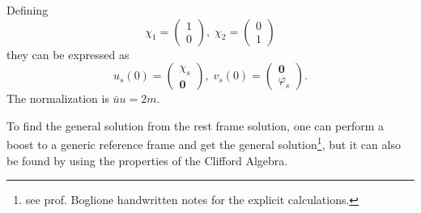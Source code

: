 Defining
$$\chi_1 = \begin{pmatrix}1\\0\end{pmatrix},\;
\chi_2 = \begin{pmatrix}0\\1\end{pmatrix}$$
they can be expressed as
$$u_s(0)=\begin{pmatrix}\chi_s\\\mathbf{0}\end{pmatrix},\;
v_s(0)=\begin{pmatrix}\mathbf{0}\\\varphi_s\end{pmatrix}.$$
The normalization is $\bar u u =2m$.

To find the general solution from the rest frame solution, one can perform a
boost to a generic reference frame and get the general solution\footnote{see prof.
Boglione handwritten notes for the explicit calculations.}, but it can also
be found by using the properties of the Clifford Algebra.

